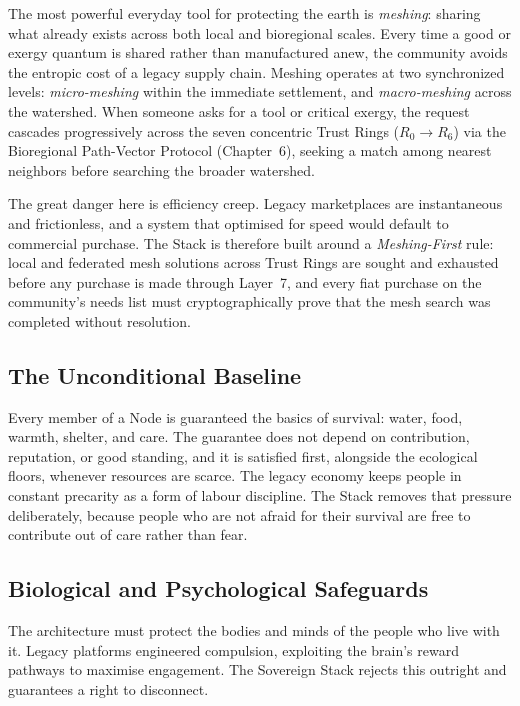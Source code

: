 The most powerful everyday tool for protecting the earth is \textit{meshing}: sharing what already exists across both local and bioregional scales. Every time a good or exergy quantum is shared rather than manufactured anew, the community avoids the entropic cost of a legacy supply chain. Meshing operates at two synchronized levels: \textit{micro-meshing} within the immediate settlement, and \textit{macro-meshing} across the watershed. When someone asks for a tool or critical exergy, the request cascades progressively across the seven concentric Trust Rings ($R_0 \to R_6$) via the Bioregional Path-Vector Protocol (Chapter~6), seeking a match among nearest neighbors before searching the broader watershed.

The great danger here is efficiency creep. Legacy marketplaces are instantaneous and frictionless, and a system that optimised for speed would default to commercial purchase. The Stack is therefore built around a \textit{Meshing-First} rule: local and federated mesh solutions across Trust Rings are sought and exhausted before any purchase is made through Layer~7, and every fiat purchase on the community's needs list must cryptographically prove that the mesh search was completed without resolution.

\subsection{The Unconditional Baseline}

Every member of a Node is guaranteed the basics of survival: water, food, warmth, shelter, and care. The guarantee does not depend on contribution, reputation, or good standing, and it is satisfied first, alongside the ecological floors, whenever resources are scarce. The legacy economy keeps people in constant precarity as a form of labour discipline. The Stack removes that pressure deliberately, because people who are not afraid for their survival are free to contribute out of care rather than fear.

\subsection{Biological and Psychological Safeguards}

The architecture must protect the bodies and minds of the people who live with it. Legacy platforms engineered compulsion, exploiting the brain's reward pathways to maximise engagement. The Sovereign Stack rejects this outright and guarantees a right to disconnect.

